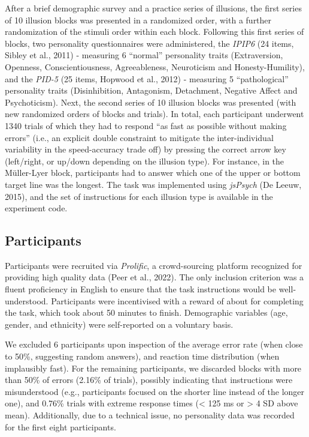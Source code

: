 \documentclass[
  man,floatsintext]{apa6}
\begin{document}
After a brief demographic survey and a practice series of illusions, the first series of 10 illusion blocks was presented in a randomized order, with a further randomization of the stimuli order within each block. Following this first series of blocks, two personality questionnaires were administered, the \emph{IPIP6} (24 items, Sibley et al., 2011) - measuring 6 ``normal'' personality traits (Extraversion, Openness, Conscientiousness, Agreeableness, Neuroticism and Honesty-Humility), and the \emph{PID-5} (25 items, Hopwood et al., 2012) - measuring 5 ``pathological'' personality traits (Disinhibition, Antagonism, Detachment, Negative Affect and Psychoticism). Next, the second series of 10 illusion blocks was presented (with new randomized orders of blocks and trials). In total, each participant underwent 1340 trials of which they had to respond ``as fast as possible without making errors'' (i.e., an explicit double constraint to mitigate the inter-individual variability in the speed-accuracy trade off) by pressing the correct arrow key (left/right, or up/down depending on the illusion type). For instance, in the Müller-Lyer block, participants had to answer which one of the upper or bottom target line was the longest. The task was implemented using \emph{jsPsych} (De Leeuw, 2015), and the set of instructions for each illusion type is available in the experiment code.

\hypertarget{participants}{%
\subsection{Participants}\label{participants}}

Participants were recruited via \emph{Prolific}, a crowd-sourcing platform recognized for providing high quality data (Peer et al., 2022). The only inclusion criterion was a fluent proficiency in English to ensure that the task instructions would be well-understood. Participants were incentivised with a reward of about  for completing the task, which took about 50 minutes to finish. Demographic variables (age, gender, and ethnicity) were self-reported on a voluntary basis.

We excluded 6 participants upon inspection of the average error rate (when close to 50\%, suggesting random answers), and reaction time distribution (when implausibly fast). For the remaining participants, we discarded blocks with more than 50\% of errors (2.16\% of trials), possibly indicating that instructions were misunderstood (e.g., participants focused on the shorter line instead of the longer one), and 0.76\% trials with extreme response times (\textless{} 125 ms or \textgreater{} 4 SD above mean). Additionally, due to a technical issue, no personality data was recorded for the first eight participants.
\end{document}
